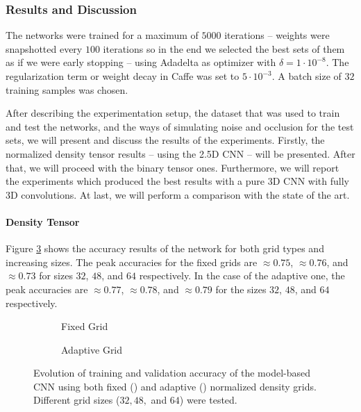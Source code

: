 \subsubsection{Results and Discussion}
\label{cha:objrecog:sec:study:subsec:experiments:subsubsec:results}

The networks were trained for a maximum of $5000$ iterations -- weights were snapshotted every $100$ iterations so in the end we selected the best sets of them as if we were early stopping -- using Adadelta as optimizer with $\delta = 1\cdot10^{-8}$. The regularization term or weight decay in Caffe was set to $5\cdot10^{-3}$. A batch size of $32$ training samples was chosen.

After describing the experimentation setup, the dataset that was used to train and test the networks, and the ways of simulating noise and occlusion for the test sets, we will present and discuss the results of the experiments. Firstly, the normalized density tensor results -- using the \acs{2.5D} \acs{CNN} -- will be presented. After that, we will proceed with the binary tensor ones. Furthermore, we will report the experiments which produced the best results with a pure \acs{3D} \acs{CNN} with fully \acs{3D} convolutions. At last, we will perform a comparison with the state of the art.

\paragraph{Density Tensor}

Figure \ref{fig:objrecog:3dcnn:experiments:25d_density} shows the accuracy results of the network for both grid types and increasing sizes. The peak accuracies for the fixed grids are $\approx0.75$, $\approx0.76$, and $\approx0.73$ for sizes $32$, $48$, and $64$ respectively. In the case of the adaptive one, the peak accuracies are $\approx0.77$, $\approx0.78$, and $\approx0.79$ for the sizes $32$, $48$, and $64$ respectively.

\begin{figure}[!b]
	\centering
	\begin{subfigure}{0.49\textwidth}
		
		\caption{Fixed Grid}
		\label{subfig:objrecog:3dcnn:experiments:25d_fixed_density}
	\end{subfigure}
	\begin{subfigure}{0.49\textwidth}
		
		\caption{Adaptive Grid}
		\label{subfig:objrecog:3dcnn:experiments:25d_adaptive_density}
	\end{subfigure}
	\caption{Evolution of training and validation accuracy of the model-based \acs{CNN} using both fixed () and adaptive () normalized density grids. Different grid sizes ($32, 48, $ and $64$) were tested.}
	\label{fig:objrecog:3dcnn:experiments:25d_density}
\end{figure}

